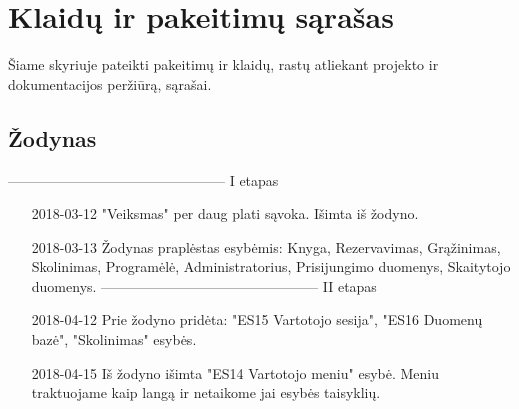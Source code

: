 \documentclass{VUMIFPSkursinis}
\begin{document}
\section{Klaidų ir pakeitimų sąrašas}
Šiame skyriuje pateikti pakeitimų ir klaidų, rastų atliekant projekto ir dokumentacijos peržiūrą, sąrašai.
\subsection{Žodynas}
----------------------------------------------- I etapas
\begin{enumerate}
\item [2018-03-12] "Veiksmas" per daug plati sąvoka. Išimta iš žodyno.
\item [2018-03-13] Žodynas praplėstas esybėmis: Knyga, Rezervavimas, Grąžinimas, Skolinimas, Programėlė, Administratorius, Prisijungimo duomenys, Skaitytojo duomenys.
----------------------------------------------- II etapas
\item [2018-04-12] Prie žodyno pridėta: "ES15 Vartotojo sesija", "ES16 Duomenų bazė", "Skolinimas" esybės.
\item [2018-04-15] Iš žodyno išimta "ES14 Vartotojo meniu" esybė. Meniu traktuojame kaip langą ir netaikome jai esybės taisyklių.\\
\end{enumerate}
\end{document}
